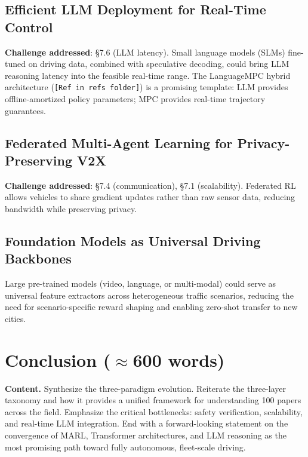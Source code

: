 \documentclass[12pt, a4paper]{article}
\begin{document}
\subsection{Efficient LLM Deployment for Real-Time Control}

\begin{outline_note}
\textbf{Challenge addressed}: \S7.6 (LLM latency).
Small language models (SLMs) fine-tuned on driving data,
combined with speculative decoding, could bring LLM reasoning
latency into the feasible real-time range.
The LanguageMPC hybrid architecture (\texttt{[Ref in refs folder]}) is a
promising template: LLM provides offline-amortized policy parameters;
MPC provides real-time trajectory guarantees.
\end{outline_note}

\subsection{Federated Multi-Agent Learning for Privacy-Preserving V2X}

\begin{outline_note}
\textbf{Challenge addressed}: \S7.4 (communication), \S7.1 (scalability).
Federated RL allows vehicles to share gradient updates rather than
raw sensor data, reducing bandwidth while preserving privacy.
\end{outline_note}

\subsection{Foundation Models as Universal Driving Backbones}

\begin{outline_note}
Large pre-trained models (video, language, or multi-modal) could
serve as universal feature extractors across heterogeneous traffic
scenarios, reducing the need for scenario-specific reward shaping
and enabling zero-shot transfer to new cities.
\end{outline_note}

\section{Conclusion \textnormal{\small ($\approx$600 words)}}
\label{sec:conclusion}

\begin{outline_note}
\textbf{Content.}
Synthesize the three-paradigm evolution.
Reiterate the three-layer taxonomy and how it provides a unified
framework for understanding 100 papers across the field.
Emphasize the critical bottlenecks: safety verification, scalability,
and real-time LLM integration.
End with a forward-looking statement on the convergence of MARL,
Transformer architectures, and LLM reasoning as the most promising
path toward fully autonomous, fleet-scale driving.
\end{outline_note}
\end{document}
